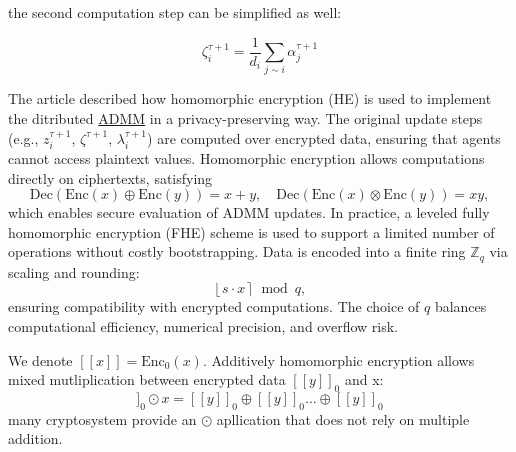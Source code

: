 \documentclass[10pt,english]{article}
\begin{document}
the second computation step can be simplified as well:

\begin{equation}\label{second step ADMM}
    \zeta_i^{\tau+1} = \frac{1}{d_i} \sum_{j \sim i} \alpha_{j}^{\tau+1}
\end{equation}   

The article described how homomorphic encryption (HE) is used to implement the ditributed \hyperref[ADMM explicit]{ADMM} in a privacy-preserving way. The original update steps (e.g., $z_i^{\tau+1}$, $\zeta^{\tau+1}$, $\lambda_i^{\tau+1}$) are computed over encrypted data, ensuring that agents cannot access plaintext values. 
Homomorphic encryption allows computations directly on ciphertexts, satisfying
\[
\mathrm{Dec}(\mathrm{Enc}(x)\oplus \mathrm{Enc}(y)) = x + y, \quad
\mathrm{Dec}(\mathrm{Enc}(x)\otimes \mathrm{Enc}(y)) = xy,
\]
which enables secure evaluation of ADMM updates. In practice, a leveled fully homomorphic encryption (FHE) scheme is used to support a limited number of operations without costly bootstrapping. Data is encoded into a finite ring $\mathbb{Z}_q$ via scaling and rounding:
\[
\left\lfloor s \cdot x \right\rceil \bmod q,
\]
ensuring compatibility with encrypted computations. The choice of $q$ balances computational efficiency, numerical precision, and overflow risk.

We denote $[\![ x ]\!] = \mathrm{Enc}_0(x)$.   
Additively homomorphic encryption allows mixed mutliplication between encrypted data $[\![y]\!]_0$ and x:
\begin{equation}
[\![y]\!]_0\odot x = [\![y]\!]_0 \oplus [\![y]\!]_0 ... \oplus [\![y]\!]_0
\end{equation}
many cryptosystem provide an $\odot$ apllication that does not rely on multiple addition. 
\end{document}
